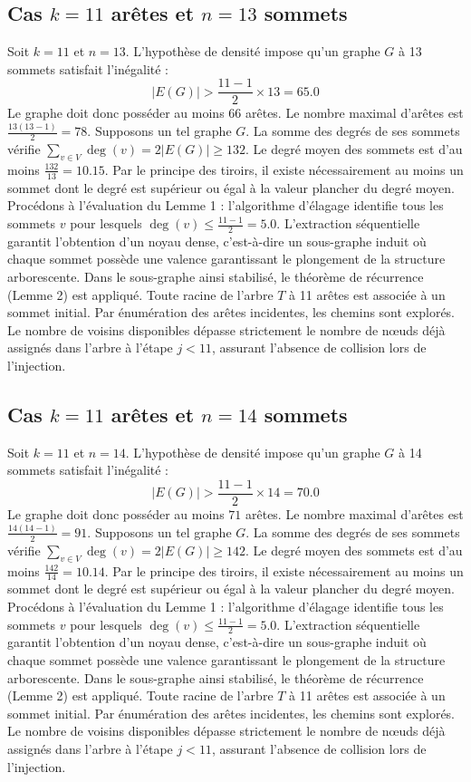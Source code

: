 \documentclass[12pt,a4paper]{article}
\begin{document}
\subsection{Cas $k = 11$ arêtes et $n = 13$ sommets}
Soit $k = 11$ et $n = 13$. L'hypothèse de densité impose qu'un graphe $G$ à 13 sommets satisfait l'inégalité :
$$ |E(G)| > \frac{11-1}{2} \times 13 = 65.0 $$
Le graphe doit donc posséder au moins $66$ arêtes. Le nombre maximal d'arêtes est $\frac{13(13-1)}{2} = 78$.
Supposons un tel graphe $G$. La somme des degrés de ses sommets vérifie $\sum_{v \in V} \deg(v) = 2|E(G)| \geq 132$.
Le degré moyen des sommets est d'au moins $\frac{132}{13} = 10.15$.
Par le principe des tiroirs, il existe nécessairement au moins un sommet dont le degré est supérieur ou égal à la valeur plancher du degré moyen.
Procédons à l'évaluation du Lemme 1 : l'algorithme d'élagage identifie tous les sommets $v$ pour lesquels $\deg(v) \leq \frac{11-1}{2} = 5.0$.
L'extraction séquentielle garantit l'obtention d'un noyau dense, c'est-à-dire un sous-graphe induit où chaque sommet possède une valence garantissant le plongement de la structure arborescente.
Dans le sous-graphe ainsi stabilisé, le théorème de récurrence (Lemme 2) est appliqué. Toute racine de l'arbre $T$ à 11 arêtes est associée à un sommet initial. Par énumération des arêtes incidentes, les chemins sont explorés. Le nombre de voisins disponibles dépasse strictement le nombre de nœuds déjà assignés dans l'arbre à l'étape $j < 11$, assurant l'absence de collision lors de l'injection.

\subsection{Cas $k = 11$ arêtes et $n = 14$ sommets}
Soit $k = 11$ et $n = 14$. L'hypothèse de densité impose qu'un graphe $G$ à 14 sommets satisfait l'inégalité :
$$ |E(G)| > \frac{11-1}{2} \times 14 = 70.0 $$
Le graphe doit donc posséder au moins $71$ arêtes. Le nombre maximal d'arêtes est $\frac{14(14-1)}{2} = 91$.
Supposons un tel graphe $G$. La somme des degrés de ses sommets vérifie $\sum_{v \in V} \deg(v) = 2|E(G)| \geq 142$.
Le degré moyen des sommets est d'au moins $\frac{142}{14} = 10.14$.
Par le principe des tiroirs, il existe nécessairement au moins un sommet dont le degré est supérieur ou égal à la valeur plancher du degré moyen.
Procédons à l'évaluation du Lemme 1 : l'algorithme d'élagage identifie tous les sommets $v$ pour lesquels $\deg(v) \leq \frac{11-1}{2} = 5.0$.
L'extraction séquentielle garantit l'obtention d'un noyau dense, c'est-à-dire un sous-graphe induit où chaque sommet possède une valence garantissant le plongement de la structure arborescente.
Dans le sous-graphe ainsi stabilisé, le théorème de récurrence (Lemme 2) est appliqué. Toute racine de l'arbre $T$ à 11 arêtes est associée à un sommet initial. Par énumération des arêtes incidentes, les chemins sont explorés. Le nombre de voisins disponibles dépasse strictement le nombre de nœuds déjà assignés dans l'arbre à l'étape $j < 11$, assurant l'absence de collision lors de l'injection.
\end{document}

